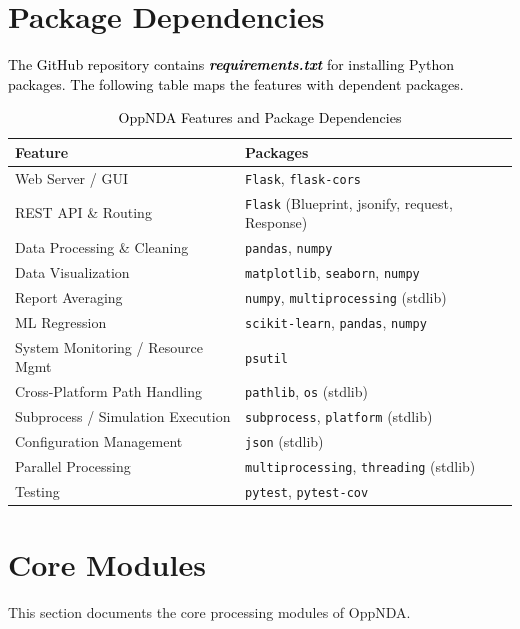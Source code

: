 \documentclass[a4paper,11pt,english,openany,oneside]{sphinxmanual}
\begin{document}
\chapter{Package Dependencies}

\sphinxAtStartPar
    \textcolor{black}{The GitHub repository contains \textbf{\emph{requirements.txt}} for installing Python packages. The following table maps the features with dependent packages.}
    \begin{table}[htbp]
\centering
\caption{\textcolor{black}{OppNDA Features and Package Dependencies}}
\label{tab:features-libraries}
\begin{tabular}{|l|l|}
\hline
\textbf{Feature} & \textbf{Packages} \\
\hline
Web Server / GUI & \texttt{Flask}, \texttt{flask-cors} \\
\hline
REST API \& Routing & \texttt{Flask} (Blueprint, jsonify, request, Response) \\
\hline
Data Processing \& Cleaning & \texttt{pandas}, \texttt{numpy} \\
\hline
Data Visualization & \texttt{matplotlib}, \texttt{seaborn}, \texttt{numpy} \\
\hline
Report Averaging & \texttt{numpy}, \texttt{multiprocessing} (stdlib) \\
\hline
ML Regression & \texttt{scikit-learn}, \texttt{pandas}, \texttt{numpy} \\
\hline
System Monitoring / Resource Mgmt & \texttt{psutil} \\
\hline
Cross-Platform Path Handling & \texttt{pathlib}, \texttt{os} (stdlib) \\
\hline
Subprocess / Simulation Execution & \texttt{subprocess}, \texttt{platform} (stdlib) \\
\hline
Configuration Management & \texttt{json} (stdlib) \\
\hline
Parallel Processing & \texttt{multiprocessing}, \texttt{threading} (stdlib) \\
\hline
Testing & \texttt{pytest}, \texttt{pytest-cov} \\
\hline
\end{tabular}
\end{table}

\vspace*{\fill}
\newpage
\pagestyle{normal}
\label{\detokenize{index::doc}}


\sphinxstepscope

\chapter{Core Modules}
\label{\detokenize{modules/core:core-modules}}\label{\detokenize{modules/core::doc}}
\sphinxAtStartPar
This section documents the core processing modules of OppNDA.
\end{document}
